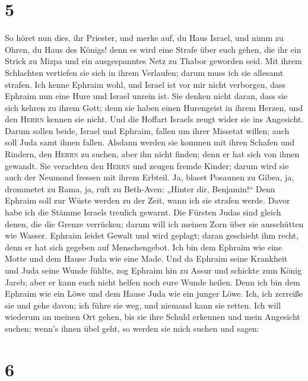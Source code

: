 \hypertarget{section-4}{%
\section{5}\label{section-4}}

 So höret nun dies, ihr Priester, und merke auf, du Haus
Israel, und nimm zu Ohren, du Haus des Königs! denn es wird eine Strafe
über euch gehen, die ihr ein Strick zu Mizpa und ein ausgespanntes Netz
zu Thabor geworden seid.  Mit ihrem Schlachten vertiefen
sie sich in ihrem Verlaufen; darum muss ich sie allesamt strafen.
 Ich kenne Ephraim wohl, und Israel ist vor mir nicht
verborgen, dass Ephraim nun eine Hure und Israel unrein ist.
 Sie denken nicht daran, dass sie sich kehren zu ihrem
Gott; denn sie haben einen Hurengeist in ihrem Herzen, und den
\textsc{Herrn} kennen sie nicht.  Und die Hoffart Israels
zeugt wider sie ins Angesicht. Darum sollen beide, Israel und Ephraim,
fallen um ihrer Missetat willen; auch soll Juda samt ihnen fallen.
 Alsdann werden sie kommen mit ihren Schafen und Rindern,
den \textsc{Herrn} zu suchen, aber ihn nicht finden; denn er hat sich
von ihnen gewandt.  Sie verachten den \textsc{Herrn} und
zeugen fremde Kinder; darum wird sie auch der Neumond fressen mit ihrem
Erbteil.  Ja, blaset Posaunen zu Gibea, ja, drommetet zu
Rama, ja, ruft zu Beth-Aven: „Hinter dir, Benjamin!{}`` 
Denn Ephraim soll zur Wüste werden zu der Zeit, wann ich sie strafen
werde. Davor habe ich die Stämme Israels treulich gewarnt.
 Die Fürsten Judas sind gleich denen, die die Grenze
verrücken; darum will ich meinen Zorn über sie ausschütten wie Wasser.
 Ephraim leidet Gewalt und wird geplagt; daran geschieht
ihm recht, denn er hat sich gegeben auf Menschengebot. 
Ich bin dem Ephraim wie eine Motte und dem Hause Juda wie eine Made.
 Und da Ephraim seine Krankheit und Juda seine Wunde
fühlte, zog Ephraim hin zu Assur und schickte zum König Jareb; aber er
kann euch nicht helfen noch eure Wunde heilen.  Denn ich
bin dem Ephraim wie ein Löwe und dem Hause Juda wie ein junger Löwe.
Ich, ich zerreiße sie und gehe davon; ich führe sie weg, und niemand
kann sie retten.  Ich will wiederum an meinen Ort gehen,
bis sie ihre Schuld erkennen und mein Angesicht suchen; wenn's ihnen
übel geht, so werden sie mich suchen und sagen:

\hypertarget{section-5}{%
\section{6}\label{section-5}}

